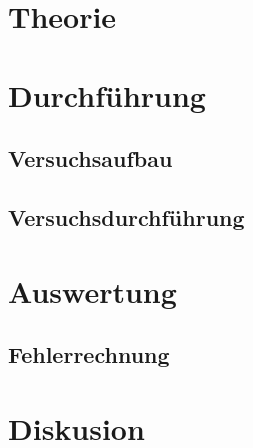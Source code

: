 \maketitle
\setcounter{page}{1}
\newpage
{}
\section{Theorie}
\section{Durchführung}
\subsection{Versuchsaufbau}
\subsection{Versuchsdurchführung}
\section{Auswertung}
\subsection{Fehlerrechnung}
\section{Diskusion}
\newpage
\nocite{*}
\printbibliography
